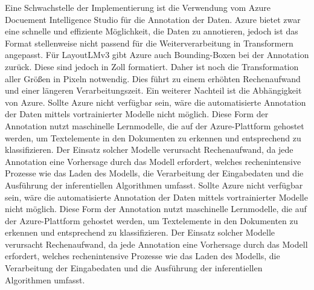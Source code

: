 Eine Schwachstelle der Implementierung ist die Verwendung vom Azure Docuement Intelligence Studio für die Annotation der Daten. Azure bietet zwar eine schnelle und effiziente Möglichkeit, die Daten zu annotieren, jedoch ist das Format stellenweise nicht passend für die Weiterverarbeitung in Transformern angepasst. Für LayoutLMv3 gibt Azure auch Bounding-Boxen bei der Annotation zurück. Diese sind jedoch in Zoll formatiert. Daher ist noch die Transformation aller Größen in Pixeln notwendig. Dies führt zu einem erhöhten Rechenaufwand und einer längeren Verarbeitungszeit. Ein weiterer Nachteil ist die Abhängigkeit von Azure. Sollte Azure nicht verfügbar sein, wäre die automatisierte Annotation der Daten mittels vortrainierter Modelle nicht möglich. Diese Form der Annotation nutzt maschinelle Lernmodelle, die auf der Azure-Plattform gehostet werden, um Textelemente in den Dokumenten zu erkennen und entsprechend zu klassifizieren. Der Einsatz solcher Modelle verursacht Rechenaufwand, da jede Annotation eine Vorhersage durch das Modell erfordert, welches rechenintensive Prozesse wie das Laden des Modells, die Verarbeitung der Eingabedaten und die Ausführung der inferentiellen Algorithmen umfasst. Sollte Azure nicht verfügbar sein, wäre die automatisierte Annotation der Daten mittels vortrainierter Modelle nicht möglich. Diese Form der Annotation nutzt maschinelle Lernmodelle, die auf der Azure-Plattform gehostet werden, um Textelemente in den Dokumenten zu erkennen und entsprechend zu klassifizieren. Der Einsatz solcher Modelle verursacht Rechenaufwand, da jede Annotation eine Vorhersage durch das Modell erfordert, welches rechenintensive Prozesse wie das Laden des Modells, die Verarbeitung der Eingabedaten und die Ausführung der inferentiellen Algorithmen umfasst.
